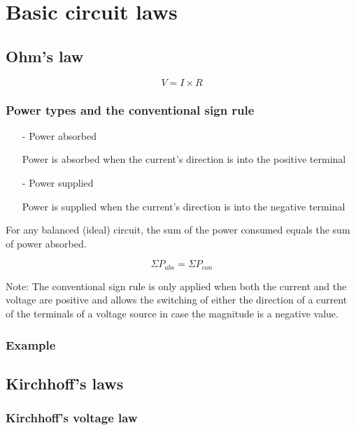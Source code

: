 \documentclass[a4paper]{book}
\begin{document}
\section{Basic circuit laws}

\subsection{Ohm's law}

\[V = I \times R\]

\subsubsection{Power types and the conventional sign rule}

\begin{itemize}

  \item[-] Power absorbed

    Power is absorbed when the current's direction is into the positive terminal


  \item[-] Power supplied

    Power is supplied when the current's direction is into the negative terminal


\end{itemize}

For any balanced (ideal) circuit, the sum of the power consumed equals the sum of power absorbed.

\[\Sigma P_{abs} = \Sigma P_{con}\]

\noindent Note: The conventional sign rule is only applied when both the current 
and the voltage are positive and allows the switching of either the direction of 
a current of the terminals of a voltage source in case the magnitude is a negative 
value.

\subsubsection{Example}


\subsection{Kirchhoff's laws}

\subsubsection{Kirchhoff's voltage law}
\end{document}
